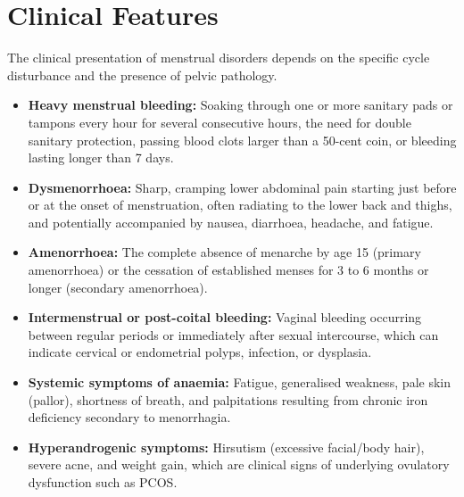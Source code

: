 \section*{Clinical Features}
The clinical presentation of menstrual disorders depends on the specific cycle disturbance and the presence of pelvic pathology.
\begin{itemize}
    \item \textbf{Heavy menstrual bleeding:} Soaking through one or more sanitary pads or tampons every hour for several consecutive hours, the need for double sanitary protection, passing blood clots larger than a 50-cent coin, or bleeding lasting longer than 7 days.
    \item \textbf{Dysmenorrhoea:} Sharp, cramping lower abdominal pain starting just before or at the onset of menstruation, often radiating to the lower back and thighs, and potentially accompanied by nausea, diarrhoea, headache, and fatigue.
    \item \textbf{Amenorrhoea:} The complete absence of menarche by age 15 (primary amenorrhoea) or the cessation of established menses for 3 to 6 months or longer (secondary amenorrhoea).
    \item \textbf{Intermenstrual or post-coital bleeding:} Vaginal bleeding occurring between regular periods or immediately after sexual intercourse, which can indicate cervical or endometrial polyps, infection, or dysplasia.
    \item \textbf{Systemic symptoms of anaemia:} Fatigue, generalised weakness, pale skin (pallor), shortness of breath, and palpitations resulting from chronic iron deficiency secondary to menorrhagia.
    \item \textbf{Hyperandrogenic symptoms:} Hirsutism (excessive facial/body hair), severe acne, and weight gain, which are clinical signs of underlying ovulatory dysfunction such as PCOS.
\end{itemize}

